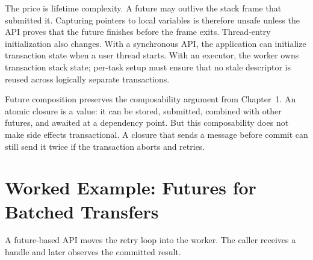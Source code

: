 The price is lifetime complexity. A future may outlive the stack frame that submitted it. Capturing pointers to local variables is therefore unsafe unless the API proves that the future finishes before the frame exits. Thread-entry initialization also changes. With a synchronous API, the application can initialize transaction state when a user thread starts. With an executor, the worker owns transaction stack state; per-task setup must ensure that no stale descriptor is reused across logically separate transactions.

Future composition preserves the composability argument from Chapter~1. An atomic closure is a value: it can be stored, submitted, combined with other futures, and awaited at a dependency point. But this composability does not make side effects transactional. A closure that sends a message before commit can still send it twice if the transaction aborts and retries.

\section{Worked Example: Futures for Batched Transfers}

A future-based API moves the retry loop into the worker. The caller receives a
handle and later observes the committed result.

